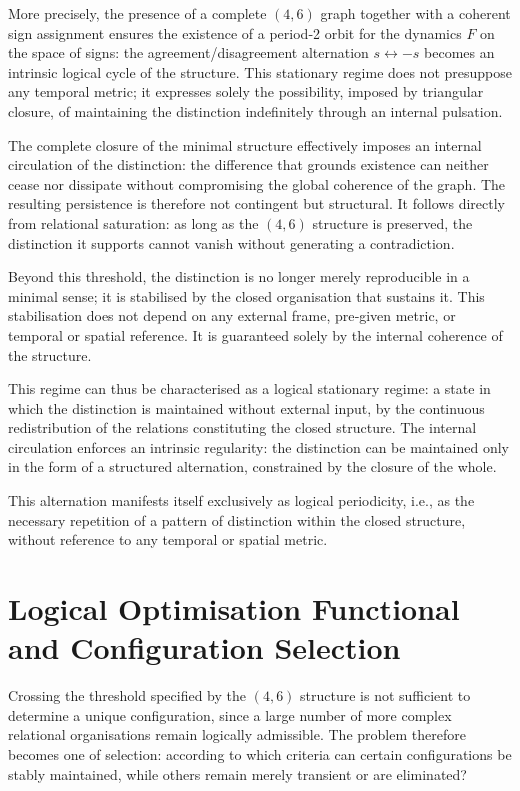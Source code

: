 \documentclass[11pt,a4paper]{article}
\begin{document}
More precisely, the presence of a complete \((4,6)\) graph together with a coherent sign assignment ensures the existence of a period‑2 orbit for the dynamics \(F\) on the space of signs: the agreement/disagreement alternation \(s \leftrightarrow -s\) becomes an intrinsic logical cycle of the structure. This stationary regime does not presuppose any temporal metric; it expresses solely the possibility, imposed by triangular closure, of maintaining the distinction indefinitely through an internal pulsation.

The complete closure of the minimal structure effectively imposes an internal circulation of the distinction: the difference that grounds existence can neither cease nor dissipate without compromising the global coherence of the graph. The resulting persistence is therefore not contingent but structural. It follows directly from relational saturation: as long as the \((4,6)\) structure is preserved, the distinction it supports cannot vanish without generating a contradiction.

Beyond this threshold, the distinction is no longer merely reproducible in a minimal sense; it is stabilised by the closed organisation that sustains it. This stabilisation does not depend on any external frame, pre‑given metric, or temporal or spatial reference. It is guaranteed solely by the internal coherence of the structure.

This regime can thus be characterised as a logical stationary regime: a state in which the distinction is maintained without external input, by the continuous redistribution of the relations constituting the closed structure. The internal circulation enforces an intrinsic regularity: the distinction can be maintained only in the form of a structured alternation, constrained by the closure of the whole.

This alternation manifests itself exclusively as logical periodicity, i.e., as the necessary repetition of a pattern of distinction within the closed structure, without reference to any temporal or spatial metric.

\section{Logical Optimisation Functional and Configuration Selection}

Crossing the threshold specified by the \((4,6)\) structure is not sufficient to determine a unique configuration, since a large number of more complex relational organisations remain logically admissible. The problem therefore becomes one of selection: according to which criteria can certain configurations be stably maintained, while others remain merely transient or are eliminated?
\end{document}
